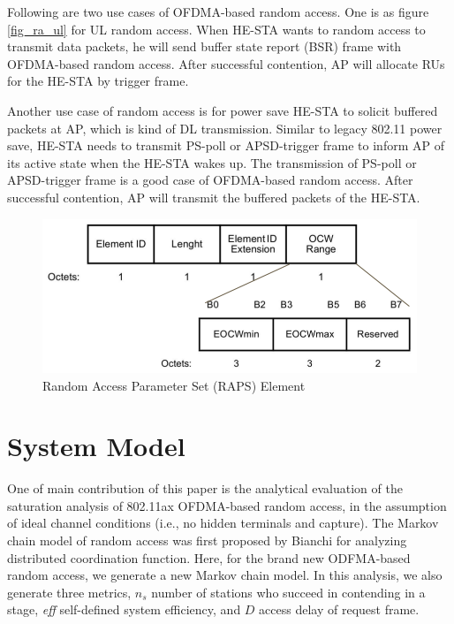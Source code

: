 \documentclass[journal]{IEEEtran}
\begin{document}
Following are two use cases of OFDMA-based random access. 
One is as figure \ref{fig_ra_ul} for UL random access. 
When HE-STA wants to random access to transmit data packets, he will send buffer state report (BSR) frame with OFDMA-based random access. 
After successful contention, AP will allocate RUs for the HE-STA by trigger frame. 


Another use case of random access is for power save HE-STA to solicit buffered packets at AP, which is kind of DL transmission.
Similar to legacy 802.11 power save, HE-STA needs to transmit PS-poll or APSD-trigger frame to inform AP of its active state when the HE-STA wakes up.
The transmission of PS-poll or APSD-trigger frame is a good case of OFDMA-based random access. After successful contention, AP will transmit the buffered packets of the HE-STA.

\begin{figure}[!h]
\includegraphics[scale=0.3]{./figure/RAPS.png}
\caption{Random Access Parameter Set (RAPS) Element}
\label{fig_RAPS}
\end{figure}



\section{System Model} 		\label{sec_sys_model}
One of main contribution of this paper is the analytical evaluation of the saturation analysis of 802.11ax OFDMA-based random access, in the assumption of ideal channel conditions (i.e., no hidden terminals and capture). 
The Markov chain model of random access was first proposed by Bianchi for analyzing distributed coordination function\cite{bianchi2000performance}. 
Here, for the brand new ODFMA-based random access, we generate a new Markov chain model. 
In this analysis, we also generate three metrics, $n_s$ number of stations who succeed in contending in a stage, \textit{eff} self-defined system efficiency, and $D$ access delay of request frame. 
\end{document}
